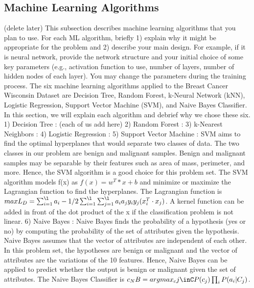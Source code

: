 \documentclass[conference]{IEEEtran}
\begin{document}
\subsection{Machine Learning Algorithms}
(delete later) This subsection describes machine learning algorithms that you plan to use. For each ML algorithm, briefly 1) explain why it might be appropriate for the problem and 2) describe your main design. For example, if it is neural network, provide the network structure and your initial choice of some key parameters (e.g., activation function to use, number of layers, number of hidden nodes of each layer). You may change the parameters during the training process. 
The six machine learning algorithms applied to the Breast Cancer Wisconsin Dataset are Decision Tree, Random Forest, k-Neural Network (kNN), Logistic Regression, Support Vector Machine (SVM), and Naive Bayes Classifier. In this section, we will explain each algorithm and debrief why we chose these six. 
1) Decision Tree :   (each of us add here)
2) Random Forest :
3) k-Nearest Neighbors :
4) Logistic Regression :
5) Support Vector Machine : SVM aims to find the optimal hyperplanes that would separate two classes of data. The two classes in our problem are benign and malignant samples. Benign and malignant samples may be separable by their features such as area of mass, perimeter, and more. Hence, the SVM algorithm is a good choice for this problem set. The SVM algorithm models f(x) as \(f(x) = w^T*x + b\) and minimize or maximize the Lagrangian function to find the hyperplanes. The Lagrangian function is \(max L_D = \sum_{i=1}^{\l}a_i - 1/2\sum_{i=1}^{\l}\sum_{j=1}^{\l}a_i a_j y_i y_j(x_i^T \cdot x_j)\). A kernel function can be added in front of the dot product of the x if the classification problem is not linear. 
6) Naive Bayes : Naive Bayes finds the probability of a hypothesis (yes or no) by computing the probability of the set of attributes given the hypothesis. Naive Bayes assumes that the vector of attributes are independent of each other. In this problem set, the hypotheses are benign or malignant and the vector of attributes are the variations of the 10 features. Hence, Naive Bayes can be applied to predict whether the output is benign or malignant given the set of attributes. The Naive Bayes Classifier is \(c_NB = argmax_cj\inC P(c_j) \prod_i P(a_i |C_j)\). 
\end{document}
